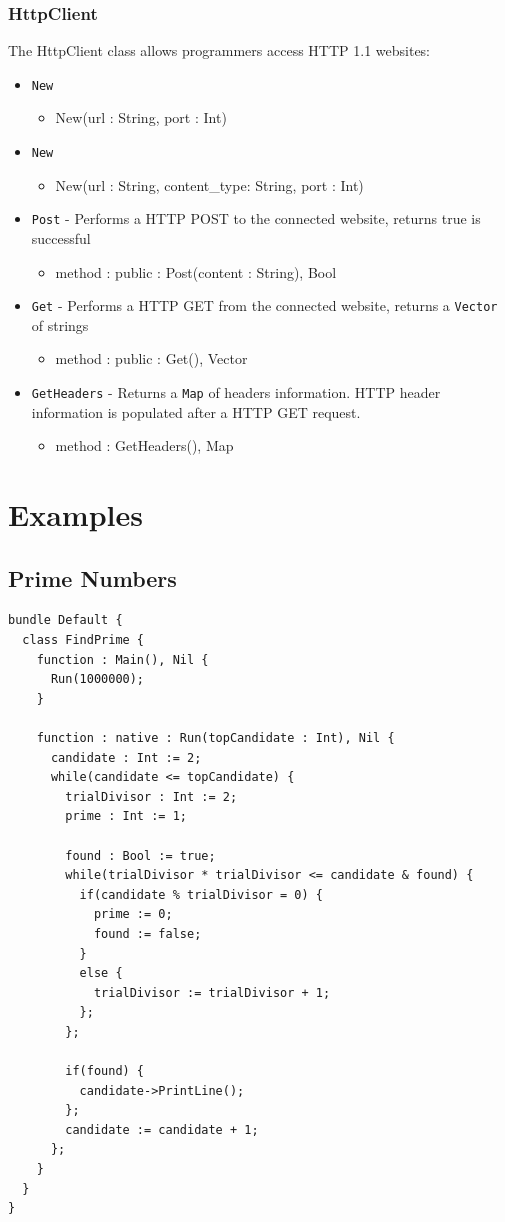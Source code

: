 \documentclass[12pt]{article}
\begin{document}
\subsubsection{HttpClient}
The HttpClient class allows programmers access HTTP 1.1 websites:
\begin{itemize}
    \item \texttt{New}
    	\begin{itemize}
	\item New(url : String, port : Int)
	\end{itemize}
    \item \texttt{New}
    	\begin{itemize}
	\item New(url : String, content\_type: String, port : Int)
	\end{itemize}
    \item \texttt{Post} - Performs a HTTP POST to the connected website, returns true is successful
    	\begin{itemize}
	\item method : public : Post(content : String), Bool
	\end{itemize}
    \item \texttt{Get} - Performs a HTTP GET from the connected website, returns a \texttt{Vector} of strings
    	\begin{itemize}
	\item method : public : Get(), Vector
	\end{itemize}
    \item \texttt{GetHeaders} - Returns a \texttt{Map} of headers information.  HTTP header information is populated after a HTTP GET request.
    	\begin{itemize}
	\item method : GetHeaders(), Map
	\end{itemize}
\end{itemize}

\section{Examples}
\subsection{Prime Numbers}
\begin{verbatim}
bundle Default {
  class FindPrime {
    function : Main(), Nil {
      Run(1000000);
    }

    function : native : Run(topCandidate : Int), Nil {
      candidate : Int := 2;
      while(candidate <= topCandidate) {
        trialDivisor : Int := 2;
        prime : Int := 1;

        found : Bool := true;
        while(trialDivisor * trialDivisor <= candidate & found) {
          if(candidate % trialDivisor = 0) {
            prime := 0;
            found := false;
          }
          else {
            trialDivisor := trialDivisor + 1;
          };
        };

        if(found) {
          candidate->PrintLine();
        };
        candidate := candidate + 1;
      };
    }
  }
}
\end{verbatim}
\end{document}
